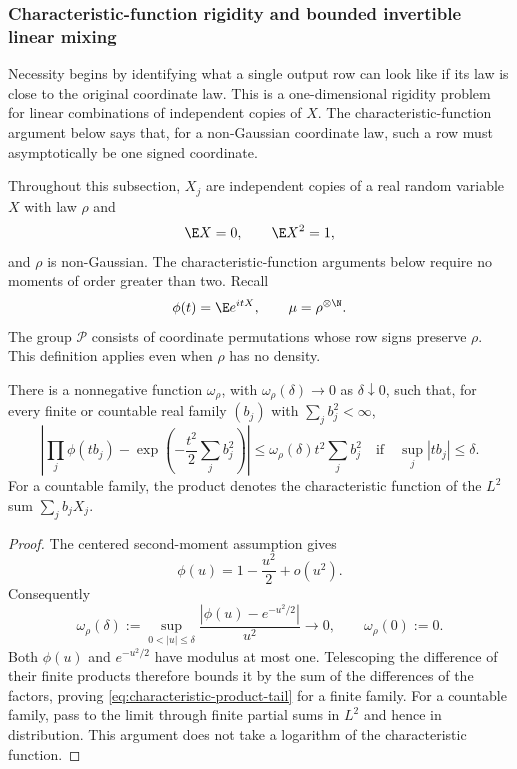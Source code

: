 \subsubsection{Characteristic-function rigidity and bounded invertible linear mixing}
\label{sec:characteristic-function-rigidity}

Necessity begins by identifying what a single output row can look like if
its law is close to the original coordinate law.
This is a one-dimensional rigidity problem for linear combinations of
independent copies of \(X\).
The characteristic-function argument below says that, for a non-Gaussian
coordinate law, such a row must asymptotically be one signed coordinate.

Throughout this subsection, $X_j$ are independent copies of a real random
variable $X$ with law $\rho$ and
\[
  \E X=0,\qquad \E X^2=1,
\]
and $\rho$ is non-Gaussian.  The characteristic-function arguments
below require no moments of order greater than two.  Recall
\[
  \phi(t)=\E e^{itX},\qquad \mu=\rho^{\otimes\N}.
\]
The group $\mathcal P$ consists of coordinate permutations whose row
signs preserve $\rho$.  This definition applies even when $\rho$ has
no density.

\begin{lemma}
\label{lem:characteristic-product-tail}
There is a nonnegative function $\omega_\rho$, with
$\omega_\rho(\delta)\to0$ as
$\delta\downarrow0$, such that, for every finite or countable real family
$(b_j)$ with $\sum_j b_j^2<\infty$,
\begin{equation}
 \left|\prod_j\phi(tb_j)
       -\exp\!\left(-\frac{t^2}{2}\sum_jb_j^2\right)\right|
 \leq \omega_\rho(\delta)t^2\sum_jb_j^2
 \quad\text{if}\quad \sup_j|tb_j|\leq\delta.
 \label{eq:characteristic-product-tail}
\end{equation}
For a countable family, the product denotes the characteristic function
of the $L^2$ sum $\sum_jb_jX_j$.
\end{lemma}
\begin{proof}
The centered second-moment assumption gives
\[
 \phi(u)=1-\frac{u^2}{2}+o(u^2).
\]
Consequently
\[
 \omega_\rho(\delta):=
 \sup_{0<|u|\leq\delta}
 \frac{|\phi(u)-e^{-u^2/2}|}{u^2}
 \longrightarrow0,\qquad \omega_\rho(0):=0.
\]
Both $\phi(u)$ and $e^{-u^2/2}$ have modulus at most one.  Telescoping
the difference of their finite products therefore bounds it by the sum
of the differences of the factors, proving
\eqref{eq:characteristic-product-tail} for a finite family.
For a countable family, pass to the limit through finite partial sums in
$L^2$ and hence in distribution.  This argument does not take a logarithm
of the characteristic function.
\end{proof}

